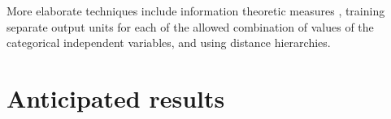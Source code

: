 \documentclass[12pt]{article}
\begin{document}
More elaborate techniques include information theoretic measures
\cite{wang2008categorical}, training separate output units for
each of the allowed combination of values of the categorical independent
variables\cite{brouwer2002feed}, and using distance
hierarchies\cite{hsu2006generalizing}.
\section{Anticipated results}

\pagebreak




%
%

\itemize
\end{document}
